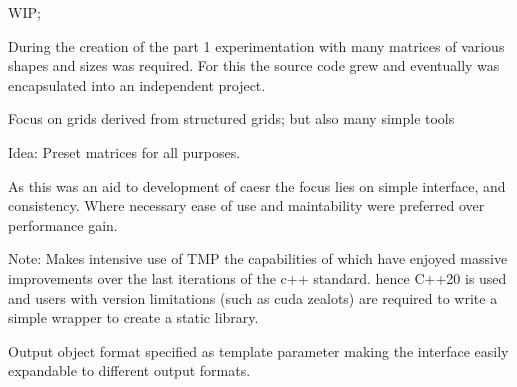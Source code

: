 WIP;

During the creation of the part 1 experimentation with many matrices of various shapes and sizes was required. For this
the source code grew and eventually was encapsulated into an independent project.

Focus on grids derived from structured grids; but also many simple tools

Idea: Preset matrices for all purposes.

As this was an aid to development of caesr the focus lies on simple interface, and consistency. Where necessary ease of
use and maintability were preferred over performance gain.

Note: Makes intensive use of TMP the capabilities of which have enjoyed massive improvements over the last iterations of
the c++ standard. hence C++20 is used and users with version limitations (such as cuda zealots) are required to write a
simple wrapper to create a static library.

Output object format specified as template parameter making the interface easily expandable to different
output formats.
